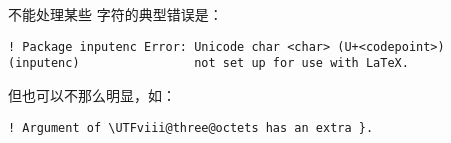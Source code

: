  不能处理某些 \utf 字符的典型错误是：

\begin{verbatim}
! Package inputenc Error: Unicode char <char> (U+<codepoint>)
(inputenc)                not set up for use with LaTeX.
\end{verbatim}
%
但也可以不那么明显，如：

\begin{verbatim}
! Argument of \UTFviii@three@octets has an extra }.
\end{verbatim}

\endinput
